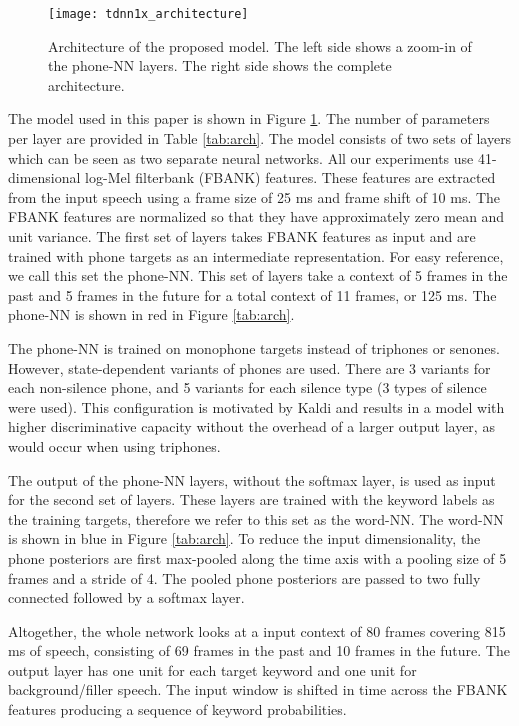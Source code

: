 \documentclass{article}
\begin{document}
\begin{figure}[htb]
\begin{minipage}[b]{1.1\linewidth}
  \centering
  \centerline{\texttt{[image: tdnn1x\_architecture]}}
\end{minipage}
\caption{Architecture of the proposed model.  The left side shows a zoom-in of the phone-NN layers.  The right side shows the complete architecture.}
\label{fig:tdnn}
\end{figure}

The model used in this paper is shown in Figure \ref{fig:tdnn}. The number of parameters per layer are provided in Table \ref{tab:arch}. The model consists of two sets of layers which can be seen as two separate neural networks. All our experiments use 41-dimensional log-Mel filterbank (FBANK) features.  These features are extracted from the input speech using a frame size of 25 ms and frame shift of 10 ms. The FBANK features are normalized so that they have approximately zero mean and unit variance. The first set of layers takes FBANK features as input and are trained with phone targets as an intermediate representation. For easy reference, we call this set the phone-NN. This set of layers take a context of 5 frames in the past and 5 frames in the future for a total context of 11 frames, or 125 ms.  The phone-NN is shown in red in Figure \ref{tab:arch}.

The phone-NN is trained on monophone targets instead of triphones or senones.  However, state-dependent variants of phones are used.  There are 3 variants for each non-silence phone, and 5 variants for each silence type (3 types of silence were used).  This configuration is motivated by Kaldi\cite{kaldi} and results in a model with higher discriminative capacity without the overhead of a larger output layer, as would occur when using triphones.

The output of the phone-NN layers, without the softmax layer, is used as input for the second set of layers. These layers are trained with the keyword labels as the training targets, therefore we refer to this set as the word-NN. The word-NN is shown in blue in Figure \ref{tab:arch}.  To reduce the input dimensionality, the phone posteriors are first max-pooled along the time axis with a pooling size of 5 frames and a stride of 4. The pooled phone posteriors are passed to two fully connected followed by a softmax layer. 

Altogether, the whole network looks at a input context of 80 frames covering 815 ms of speech, consisting of 69 frames in the past and 10 frames in the future. The output layer has one unit for each target keyword and one unit for background/filler speech. The input window is shifted in time across the FBANK features producing a sequence of keyword probabilities. 
\end{document}
